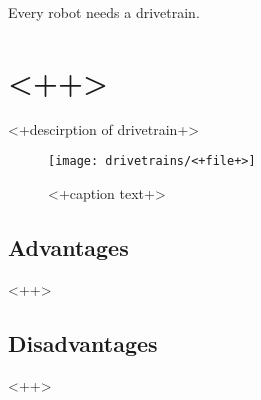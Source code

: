 \documentclass[../../main.tex]{subfiles}
\begin{document}
Every robot needs a drivetrain.

\section{<++>}

<+descirption of drivetrain+>

\begin{figure}
    \centering
    \texttt{[image: drivetrains/<+file+>]}
    \caption{<+caption text+>}
    \label{fig:drivetrain<+label+>}
\end{figure}

\subsection{Advantages}

\begin{itemize}
    <++>
\end{itemize}


\subsection{Disadvantages}

\begin{itemize}
    <++>
\end{itemize}
\end{document}
